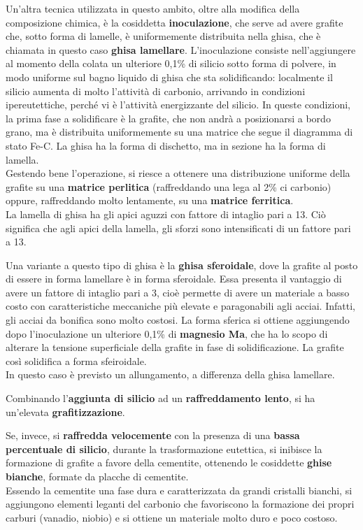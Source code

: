 Un’altra tecnica utilizzata in questo ambito, oltre alla modifica della composizione chimica, è la cosiddetta \textbf{inoculazione}, che serve ad avere grafite che, sotto forma di lamelle, è uniformemente distribuita nella ghisa, che è chiamata in questo caso \textbf{ghisa lamellare}. L’inoculazione consiste nell’aggiungere al momento della colata un ulteriore 0,1\% di silicio sotto forma di polvere, in modo uniforme sul bagno liquido di ghisa che sta solidificando: localmente il silicio aumenta di molto l’attività di carbonio, arrivando in condizioni ipereutettiche, perché vi è l’attività energizzante del silicio. In queste condizioni, la prima fase a solidificare è la grafite, che non andrà a posizionarsi a bordo grano, ma è distribuita uniformemente su una matrice che segue il diagramma di stato Fe-C. La ghisa ha la forma di dischetto, ma in sezione ha la forma di lamella.\\
Gestendo bene l’operazione, si riesce a ottenere una distribuzione uniforme della grafite su una \textbf{matrice perlitica} (raffreddando una lega al 2\% ci carbonio) oppure, raffreddando molto lentamente, su una \textbf{matrice ferritica}.\\
La lamella di ghisa ha gli apici aguzzi con fattore di intaglio pari a 13. Ciò significa che agli apici della lamella, gli sforzi sono intensificati di un fattore pari a 13.

Una variante a questo tipo di ghisa è la \textbf{ghisa sferoidale}, dove la grafite al posto di essere in forma lamellare è in forma sferoidale. Essa presenta il vantaggio di avere un fattore di intaglio pari a 3, cioè permette di avere un materiale a basso costo con caratteristiche meccaniche più elevate e paragonabili agli acciai. Infatti, gli acciai da bonifica sono molto costosi.
La forma sferica si ottiene aggiungendo dopo l’inoculazione un ulteriore 0,1\% di \textbf{magnesio Ma}, che ha lo scopo di alterare la tensione superficiale della grafite in fase di solidificazione. La grafite così solidifica a forma sfeiroidale.\\
In questo caso è previsto un allungamento, a differenza della ghisa lamellare.

Combinando l’\textbf{aggiunta di silicio} ad un \textbf{raffreddamento lento}, si ha un’elevata \textbf{grafitizzazione}.

Se, invece, si \textbf{raffredda velocemente} con la presenza di una \textbf{bassa percentuale di silicio}, durante la trasformazione eutettica, si inibisce la formazione di grafite a favore della cementite, ottenendo le cosiddette \textbf{ghise bianche}, formate da placche di cementite.\\
Essendo la cementite una fase dura e caratterizzata da grandi cristalli bianchi, si aggiungono elementi leganti del carbonio che favoriscono la formazione dei propri carburi (vanadio, niobio) e si ottiene un materiale molto duro e poco costoso.

